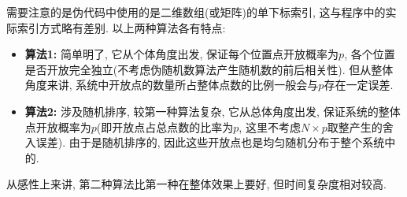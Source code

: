 \documentclass[11pt,a4paper,boxed]{caspset}
\begin{document}
需要注意的是伪代码中使用的是二维数组(或矩阵)的单下标索引, 这与程序中的实际索引方式略有差别. 以上两种算法各有特点:
 \begin{itemize}
 \item \textbf{算法1:} 简单明了, 它从个体角度出发,  保证每个位置点开放概率为$p$, 各个位置是否开放完全独立(不考虑伪随机数算法产生随机数的前后相关性). 但从整体角度来讲, 系统中开放点的数量所占整体点数的比例一般会与$p$存在一定误差.
 \item \textbf{算法2:} 涉及随机排序, 较第一种算法复杂, 它从总体角度出发, 保证系统的整体点开放概率为$p$(即开放点占总点数的比率为$p$, 这里不考虑$N\times p$取整产生的舍入误差). 由于是随机排序的, 因此这些开放点也是均匀随机分布于整个系统中的.
 \end{itemize}
从感性上来讲, 第二种算法比第一种在整体效果上要好, 但时间复杂度相对较高.
\end{document}
